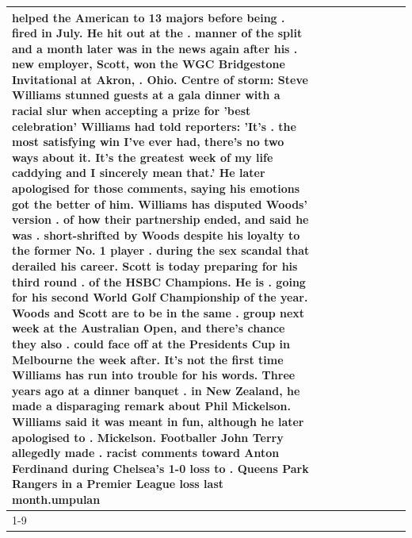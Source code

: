 \begin{table}[H]
\begin{tabular}{lllrlllll}
helped the American to 13 majors before being . fired in July. He hit out at the . manner of the split and a month later was in the news again after his . new employer, Scott, won the WGC Bridgestone Invitational at Akron, . Ohio. Centre of storm: Steve Williams stunned guests at a gala dinner with a racial slur when accepting a prize for 'best celebration' Williams had told reporters: 'It's . the most satisfying win I've ever had, there's no two ways about it. It's the greatest week of my life caddying and I sincerely mean that.' He later apologised for those comments, saying his emotions got the better of him. Williams has disputed Woods' version . of how their partnership ended, and said he was . short-shrifted by Woods despite his loyalty to the former No. 1 player . during the sex scandal that derailed his career. Scott is today preparing for his third round . of the HSBC Champions. He is . going for his second World Golf Championship of the year. Woods and Scott are to be in the same . group next week at the Australian Open, and there's chance they also . could face off at the Presidents Cup in Melbourne the week after. It's not the first time Williams has run into trouble for his words. Three years ago at a dinner banquet . in New Zealand, he made a disparaging remark about Phil Mickelson. Williams said it was meant in fun, although he later apologised to . Mickelson. Footballer John Terry allegedly made . racist comments toward Anton Ferdinand during Chelsea's 1-0 loss to . Queens Park Rangers in a Premier League loss last month.umpulan \\
\cline{1-9}

\end{tabular}
\end{table}
